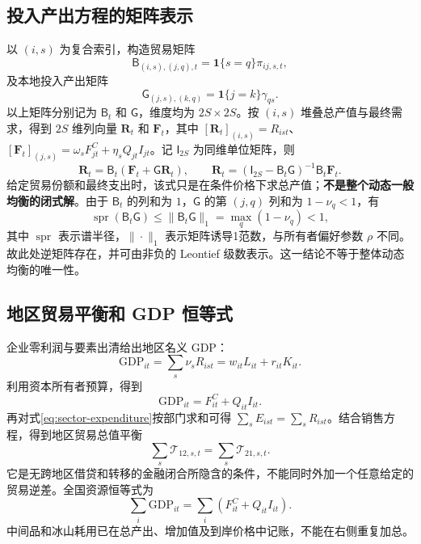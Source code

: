 \documentclass[UTF8,a4paper,zihao=-4,fontset=windows]{ctexart}
\numberwithin{equation}{section}
\newcommand{\invp}{Q}
\begin{document}
\subsection{投入产出方程的矩阵表示}
以 $(i,s)$ 为复合索引，构造贸易矩阵
\begin{equation}
 \mathsf B_{(i,s),(j,q),t}=\mathbf1\{s=q\}\pi_{ij,s,t},
\end{equation}
及本地投入产出矩阵
\begin{equation}
 \mathsf G_{(j,s),(k,q)}=\mathbf1\{j=k\}\gamma_{qs}.
\end{equation}
以上矩阵分别记为 $\mathsf B_t$ 和 $\mathsf G$，维度均为 $2S\times2S$。按 $(i,s)$ 堆叠总产值与最终需求，得到 $2S$ 维列向量 $\bm R_t$ 和 $\bm F_t$，其中 $[\bm R_t]_{(i,s)}=R_{ist}$、$[\bm F_t]_{(j,s)}=\omega_sF^C_{jt}+\eta_s\invp_{jt}I_{jt}$。记 $\mathsf I_{2S}$ 为同维单位矩阵，则
\begin{equation}
 \bm R_t=\mathsf B_t(\bm F_t+\mathsf G\bm R_t),\qquad
 \bm R_t=(\mathsf I_{2S}-\mathsf B_t\mathsf G)^{-1}\mathsf B_t\bm F_t.
 \label{eq:io-matrix}
\end{equation}
给定贸易份额和最终支出时，该式只是在条件价格下求总产值；\textbf{不是整个动态一般均衡的闭式解}。由于 $\mathsf B_t$ 的列和为 $1$，$\mathsf G$ 的第 $(j,q)$ 列和为 $1-\nu_q<1$，有
\begin{equation}
 \operatorname{spr}(\mathsf B_t\mathsf G)\leq\|\mathsf B_t\mathsf G\|_1
 =\max_q(1-\nu_q)<1,
\end{equation}
其中 $\operatorname{spr}$ 表示谱半径，$\|\cdot\|_1$ 表示矩阵诱导1范数，与所有者偏好参数 $\rho$ 不同。故此处逆矩阵存在，并可由非负的 Leontief 级数表示。这一结论不等于整体动态均衡的唯一性。

\subsection{地区贸易平衡和 GDP 恒等式}
企业零利润与要素出清给出地区名义 GDP：
\begin{equation}
 \mathrm{GDP}_{it}=\sum_s\nu_sR_{ist}=w_{it}L_{it}+r_{it}K_{it}.
 \label{eq:gdp}
\end{equation}
利用资本所有者预算，得到
\begin{equation}
 \mathrm{GDP}_{it}=F^C_{it}+\invp_{it}I_{it}.
 \label{eq:gdp-expenditure}
\end{equation}
再对式\eqref{eq:sector-expenditure}按部门求和可得 $\sum_sE_{ist}=\sum_sR_{ist}$。结合销售方程，得到地区贸易总值平衡
\begin{equation}
 \sum_s\mathcal T_{12,s,t}=\sum_s\mathcal T_{21,s,t}.
 \label{eq:balanced-trade}
\end{equation}
它是无跨地区借贷和转移的金融闭合所隐含的条件，不能同时外加一个任意给定的贸易逆差。全国资源恒等式为
\begin{equation}
 \sum_i\mathrm{GDP}_{it}=\sum_i\left(F^C_{it}+\invp_{it}I_{it}\right).
\end{equation}
中间品和冰山耗用已在总产出、增加值及到岸价格中记账，不能在右侧重复加总。
\end{document}
